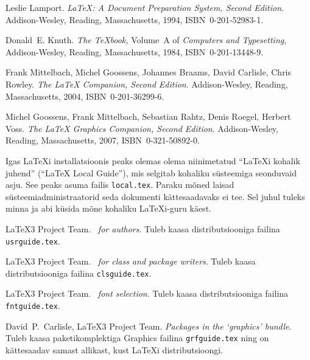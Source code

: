 \begin{thebibliography}{99}
 Leslie Lamport.  \newblock \emph{{\LaTeX:} A Document
  Preparation System, Second Edition}.  \newblock Addison-Wesley,
  Reading, Massachusetts, 1994, ISBN~0-201-52983-1.

 Donald~E. Knuth.  \newblock \textit{The \TeX{}book,}
  Volume~A of \textit{Computers and Typesetting}, Addison-Wesley,
  Reading, Massachusetts, 1984, ISBN~0-201-13448-9.

 Frank Mittelbach, Michel Goossens, Johannes Braams,
  David Carlisle, Chris Rowley.  \newblock \emph{The {\LaTeX} Companion,
  Second Edition}.  \newblock Addison-Wesley, Reading, Massachusetts,
  2004, ISBN~0-201-36299-6.

 Michel Goossens, Frank Mittelbach, Sebastian
  Rahtz, Denis Roegel, Herbert Voss.  \newblock \emph{The {\LaTeX}
  Graphics Companion, Second Edition}.  \newblock Addison-Wesley,
  Reading, Massachusetts, 2007, ISBN~0-321-50892-0.

 Igas \LaTeX i installatsioonis peaks olemas olema
  niinimetatud "`\LaTeX i kohalik juhend"' ("`\LaTeX{} Local Guide"'),
  mis selgitab kohaliku süsteemiga seonduvaid asju. See peaks asuma
  failis \texttt{local.tex}. Paraku mõned laisad
  süsteemiadministraatorid seda dokumenti kättesaadavaks ei tee. Sel
  juhul tuleks minna ja abi küsida mõne kohaliku \LaTeX i-guru käest.

 \LaTeX3 Project Team.  \newblock \emph{\LaTeXe~for
  authors}.  \newblock Tuleb kaasa \LaTeXe{} distributsiooniga failina
  \texttt{usrguide.tex}.

 \LaTeX3 Project Team.  \newblock \emph{\LaTeXe~for
  class and package writers}.  \newblock Tuleb kaasa \LaTeXe{}
  distributsiooniga failina \texttt{clsguide.tex}.

 \LaTeX3 Project Team.  \newblock \emph{\LaTeXe~font
  selection}.  \newblock Tuleb kaasa \LaTeXe{} distributsiooniga failina
  \texttt{fntguide.tex}.

 David~P.~Carlisle, \LaTeX3 Project Team.  \newblock
  \emph{Packages in the `graphics' bundle}.  \newblock Tuleb kaasa
  paketikomplektiga Graphics failina \texttt{grfguide.tex} ning on
  kättesaadav samast allikast, kust \LaTeX i distributsioongi.


\end{thebibliography}
